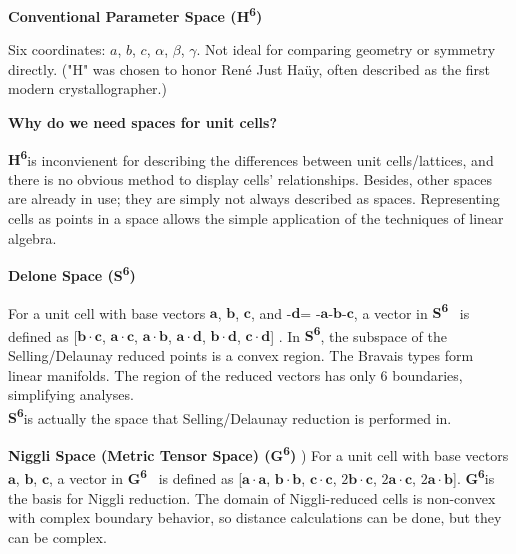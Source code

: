 \documentclass[12pt]{article}
\newcommand{\HVI}{\textbf{H\textsuperscript{6}}}
\newcommand{\GVI}{\textbf{G\textsuperscript{6}}}
\newcommand{\SVI}{\textbf{S\textsuperscript{6}}}
\newcommand{\CIII}{\textbf{C\textsuperscript{3}}}
\newcommand{\va}{\ensuremath{\mathbf{a}}}
\newcommand{\vb}{\ensuremath{\mathbf{b}}}
\newcommand{\vc}{\ensuremath{\mathbf{c}}}
\newcommand{\vd}{\ensuremath{\mathbf{d}}}
\begin{document}
	\noindent
	\parbox[t]{0.48\textwidth}{
		\tcolorbox[title=\HVI{} – Conventional Parameter Space]
		\textbf{Conventional Parameter Space (\HVI{})}
		
		Six coordinates: $a$, $b$, $c$, $\alpha$, $\beta$, $\gamma$. 
		Not ideal for comparing geometry or symmetry directly.
		("H" was chosen to honor Ren\'e Just Ha\"uy, often described as 
		the first modern crystallographer.)
		\endtcolorbox
	}
	\hfill
		\parbox[t]{0.48\textwidth}{
		\tcolorbox[title=\CIII{} – Character Space]
		\textbf{Why do we need spaces for unit cells?}
		
		\HVI is inconvienent for describing the differences between unit cells/lattices, and there is no obvious method to display cells'
		relationships. Besides, other spaces are already in use; they are
		simply not always described as spaces. Representing cells as points
		in a space allows the simple application of the techniques of
		linear algebra.
		\endtcolorbox
	}
	
	\vspace{1cm}
	
	\noindent
	\parbox[t]{0.48\textwidth}{
		\tcolorbox[title=\SVI{} – Selling/Delone Space]
		\textbf{Delone Space (\SVI{})}
		
		For a unit cell with base vectors \va, \vb, \vc,
		and -\vd = -\va-\vb-\vc, a vector in \SVI~ is defined as 
		[\ensuremath{\vb \cdot \vc}, \ensuremath{\va \cdot \vc}, \ensuremath{\va \cdot \vb},
		 \ensuremath{\va \cdot \vd}, \ensuremath{\vb \cdot \vd}, \ensuremath{\vc \cdot \vd}]
		. In \SVI, the subspace of the Selling/Delaunay reduced points is a convex region. 
		The Bravais types form linear manifolds. The region of the reduced vectors has only 6 boundaries,	simplifying analyses. \\
		\SVI is actually the space that
		Selling/Delaunay reduction is performed in.
		\endtcolorbox 
	}
	\hfill
	\parbox[t]{0.48\textwidth}{
	\tcolorbox[title=\GVI{} – Niggli Space]
	\textbf{Niggli Space (Metric Tensor Space) (\GVI{})}
	)
		For a unit cell with base vectors \va, \vb, \vc,
		a vector in \GVI~ is defined as 
	[\ensuremath{\va \cdot \va}, \ensuremath{\vb \cdot \vb}, \ensuremath{\vc \cdot \vc},
	\ensuremath{2\vb \cdot \vc}, \ensuremath{2\va \cdot \vc}, \ensuremath{2\va \cdot \vb}]. \GVI is the basis for Niggli reduction. The domain of Niggli-reduced
	cells is non-convex with complex boundary behavior, so distance
	calculations can be done, but they can be complex.
	\endtcolorbox
}
\end{document}

